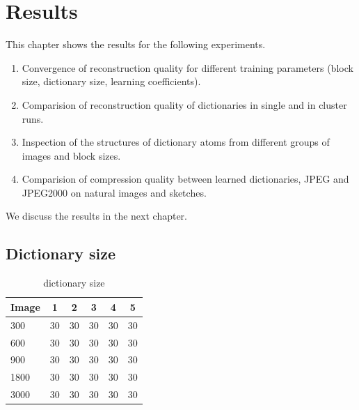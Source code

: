\chapter{Results}
This chapter shows the results for the following experiments.
\begin{enumerate}
 \item Convergence of reconstruction quality for different training parameters
(block size, dictionary size, learning coefficients).
 \item Comparision of reconstruction quality of dictionaries
in single and in cluster runs. 
 \item Inspection of the structures of dictionary atoms from different
groups of images and block sizes.
 \item Comparision of compression quality between learned dictionaries, JPEG and
JPEG2000  on natural images and sketches.
\end{enumerate}

We discuss the results in the next chapter.


\section{Dictionary size}
\begin{table}[h]
\caption{dictionary size}
\centering
\begin{tabular}{l  c  c  c  c  c}
\toprule
Image & 1 & 2 & 3 & 4 & 5 \\
\hline
300 & 30 & 30 & 30 & 30 & 30 \\
600 & 30 & 30 & 30 & 30 & 30 \\
900 & 30 & 30 & 30 & 30 & 30 \\
1800 & 30 & 30 & 30 & 30 & 30 \\
3000 & 30 & 30 & 30 & 30 & 30 \\
\bottomrule
\end{tabular}
\end{table}


